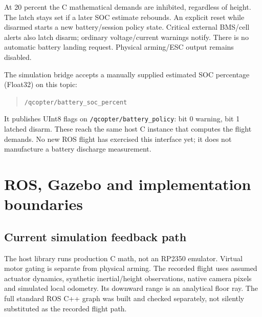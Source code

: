 At 20 percent the C mathematical demands are inhibited, regardless of height.
The latch stays set if a later SOC estimate rebounds. An explicit reset while
disarmed starts a new battery/session policy state. Critical external BMS/cell
alerts also latch disarm; ordinary voltage/current warnings notify.
There is no automatic battery landing request. Physical arming/ESC output remains
disabled.

The simulation bridge accepts a manually supplied estimated SOC percentage
(Float32) on this topic:
\begin{quote}\small\texttt{/qcopter/battery\_soc\_percent}\end{quote}
It publishes UInt8 flags on
\texttt{/qcopter/battery\_policy}: bit 0 warning, bit 1 latched disarm.
These reach the same host C instance that computes the flight demands.
No new ROS flight has exercised this interface yet; it does not manufacture
a battery discharge measurement.

\chapter{ROS, Gazebo and implementation boundaries}
\section{Current simulation feedback path}
\begin{center}
\end{center}
The host library runs production C math, not an RP2350 emulator.
Virtual motor gating is separate from physical arming.
The recorded flight uses assumed actuator dynamics, synthetic inertial/height
observations, native camera pixels and simulated local odometry. Its downward
range is an analytical floor ray. The full standard ROS C++ graph was built and
checked separately, not silently substituted as the recorded flight path.

